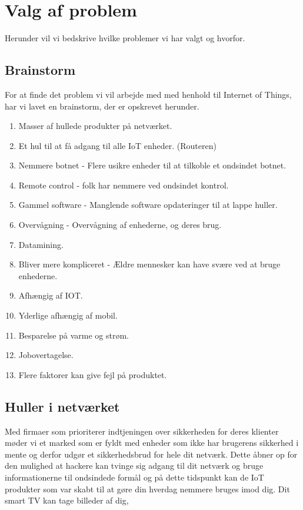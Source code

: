 \section{Valg af problem}
Herunder vil vi bedskrive hvilke problemer vi har valgt og hvorfor. 
    \subsection{Brainstorm}
    For at finde det problem vi vil arbejde med med henhold til Internet of Things, har vi lavet en brainstorm, der er opskrevet herunder.
        
        \begin{enumerate}
            \item Masser af hullede produkter på netværket.
            \item Et hul til at få adgang til alle IoT enheder. (Routeren)
            \item Nemmere botnet - Flere usikre enheder til at tilkoble et ondsindet botnet.
            \item Remote control - folk har nemmere ved ondsindet kontrol.
            \item Gammel software - Manglende software opdateringer til at lappe huller.
            \item Overvågning - Overvågning af enhederne, og deres brug.
            \item Datamining.
            \item Bliver mere kompliceret - Ældre mennesker kan have svære ved at bruge enhederne.
            \item Afhængig af IOT.
            \item Yderlige afhængig af mobil.
            \item Besparelse på varme og strøm.
            \item Jobovertagelse. 
            \item Flere faktorer kan give fejl på produktet.
        \end{enumerate}
    
    \subsection{Huller i netværket}
    Med firmaer som prioriterer indtjeningen over sikkerheden for deres klienter møder vi et marked som er fyldt med enheder som ikke har brugerens sikkerhed i mente og derfor udgør et sikkerhedsbrud for hele dit netværk. Dette åbner op for den mulighed at hackere kan tvinge sig adgang til dit netværk og bruge informationerne til ondsindede formål og på dette tidspunkt kan de IoT produkter som var skabt til at gøre din hverdag nemmere bruges imod dig. Dit smart TV kan tage billeder af dig, 
    
